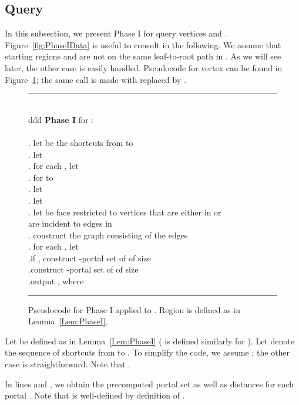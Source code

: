 \documentclass[11pt]{article}
\begin{document}
\subsection{Query}\label{subsec:Query}
In this subsection, we present Phase I for query vertices  and . Figure~\ref{fig:PhaseIData} is useful to consult in the following. We assume that starting regions  and  are not on the same leaf-to-root path in . As we will see later, the other case is easily handled. Pseudocode for vertex  can be found in Figure~\ref{fig:PhaseI}; the same call is made with  replaced by .
\begin{figure}[!ht]
\begin{tabbing}
\rule{\linewidth}{\arrayrulewidth}\\
d\=dd\=\quad\=\quad\=\quad\=\quad\=\quad\=\quad\=\quad\=\quad\=\quad\=\quad\=\quad\=\kill
\>\textbf{Phase I} for :\\\\
. \>\>let  be the shortcuts from  to \\
. \>\>let \\
. \>\>for each , let \\
. \>\>for  to \\
. \>\>\>let \\
. \>\>\>let \\
. \>\>\>let  be face  restricted to vertices that are either in  or\\
\>   \>\>\>are incident to edges in \\
. \>\>\>construct the graph  consisting of the edges \\
. \>\>\>for each , let \\
.\>\>\>if , construct -portal set  of  of size \\
.\>\>construct -portal set  of  of size \\
.\>\>output , where \\
\rule{\linewidth}{\arrayrulewidth}
\end{tabbing}
\caption{Pseudocode for Phase I applied to . Region  is defined as in Lemma~\ref{Lem:PhaseI}.}\label{fig:PhaseI}
\end{figure}

Let  be defined as in Lemma~\ref{Lem:PhaseI} ( is defined similarly for ). Let  denote the sequence of shortcuts from  to . To simplify the code, we assume ; the other case is straightforward. Note that .

In lines  and , we obtain the precomputed portal set  as well as distances  for each portal . Note that  is well-defined by definition of .
\end{document}
